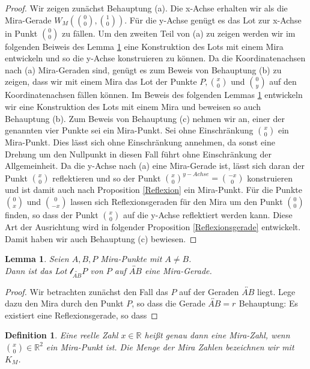\documentclass{scrbook}
\newtheorem{lemma}[theorem]{Lemma}
\newtheorem{definition}{Definition}
\begin{document}
\begin{proof}
    Wir zeigen zunächst Behauptung (a). Die x-Achse erhalten wir als die Mira-Gerade $W_M(\binom{0}{0}, \binom{1}{0})$. Für die y-Achse genügt es das Lot zur x-Achse in Punkt $\binom{0}{0}$ zu fällen. 
    Um den zweiten Teil von (a) zu zeigen werden wir im folgenden Beiweis des Lemma \ref{Lot} eine Konstruktion des Lots mit einem Mira entwickeln und so die y-Achse konstruieren zu können.
    Da die Koordinatenachsen nach (a) Mira-Geraden sind, genügt es zum Beweis von Behauptung (b) zu zeigen, dass wir mit einem Mira das Lot der Punkte $P, \binom{x}{0}$ und $\binom{0}{y}$ auf den Koordinatenachsen fällen können.
    Im Beweis des folgenden Lemmas \ref{Lot} entwickeln wir eine Konstruktion des Lots mit einem Mira und beweisen so auch Behauptung (b).
    Zum Beweis von Behauptung (c) nehmen wir an, einer der genannten vier Punkte sei ein Mira-Punkt. Sei ohne Einschränkung $\binom{x}{0}$ ein Mira-Punkt. Dies lässt sich ohne Einschränkung annehmen, da sonst eine Drehung um den Nullpunkt in diesen Fall führt ohne Einschränkung der Allgemeinheit. 
    Da die y-Achse nach (a) eine Mira-Gerade ist, lässt sich daran der Punkt  $\binom{x}{0}$ reflektieren und so der Punkt $\binom{x}{0}^{y-Achse} = \binom{-x}{0}$ konstruieren und ist damit auch nach Proposition \ref{Reflexion} ein Mira-Punkt.
    Für die Punkte $\binom{0}{x}$ und $\binom{0}{-x}$ lassen sich Reflexionsgeraden für den Mira um den Punkt $\binom{0}{0}$ finden, so dass der Punkt $\binom{x}{0}$ auf die y-Achse reflektiert werden kann. Diese Art der Ausrichtung wird in folgender Proposition \ref{Reflexionsgerade} entwickelt. Damit haben wir auch Behauptung (c) bewiesen.
\end{proof}

\begin{lemma}
    \label{Lot}
    Seien $A,B,P$ Mira-Punkte mit $A \neq B$. \\
    Dann ist das Lot $\mathcal{l}_{\overleftrightarrow{AB}}P$ von $P$ auf $\overleftrightarrow{AB}$ eine Mira-Gerade.
\end{lemma}

\begin{proof}
    Wir betrachten zunächst den Fall das $P$ auf der Geraden $\overleftrightarrow{AB}$ liegt.
    Lege dazu den Mira durch den Punkt $P$, so dass die Gerade $\overleftrightarrow{AB} = r_{}$
    Behauptung: Es existiert eine Reflexionsgerade, so dass 
\end{proof}

\begin{definition}
    Eine reelle Zahl $x \in \mathbb{R}$ heißt genau dann eine Mira-Zahl, wenn $\binom{x}{0} \in \mathbb{R}^2$ ein Mira-Punkt ist. 
    Die Menge der Mira Zahlen bezeichnen wir mit $K_M$.
\end{definition}
\end{document}
